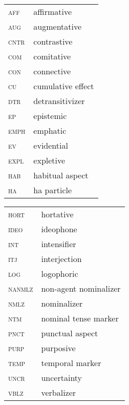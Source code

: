 \documentclass[output=paper,
modfonts,nonflat
]{langsci/langscibook}
\begin{document}
\begin{tabularx}{.45\textwidth}{lX}
\textsc{aff } & affirmative \\
\textsc{aug } & augmentative \\
\textsc{cntr } & contrastive \\
\textsc{com } & comitative \\
\textsc{con } & connective \\
\textsc{cu } & cumulative effect \\
\textsc{dtr } & detransitivizer \\
\textsc{ep } & epistemic \\
\textsc{emph } & emphatic \\
\textsc{ev } & evidential \\
\textsc{expl } & expletive \\
\textsc{hab } & habitual aspect \\
\textsc{ha } & ha particle \\
\end{tabularx}
\begin{tabularx}{.5\textwidth}{lQ}
\textsc{hort } & hortative \\
\textsc{ideo } & ideophone \\
\textsc{int } & intensifier \\
\textsc{itj } & interjection \\
\textsc{log } & logophoric \\
\textsc{nanmlz } & non-agent nominalizer\\
\textsc{nmlz } & nominalizer \\
\textsc{ntm } & nominal tense marker \\
\textsc{pnct } & punctual aspect \\
\textsc{purp } & purposive \\
\textsc{temp } & temporal marker \\
\textsc{uncr } & uncertainty \\
\textsc{vblz } & verbalizer \\
\end{tabularx}
 
{\sloppy
\printbibliography[heading=subbibliography,notkeyword=this]
}
\end{document}
